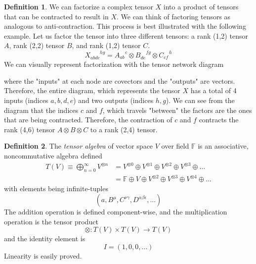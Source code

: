 \documentclass{article}
\theoremstyle{remark}
\theoremstyle{definition}
\newtheorem{definition}{Definition}[section]
\begin{document}
\begin{definition}
We can factorize a complex tensor $X$ into a product of tensors that can be contracted to result in $X$. We can think of factoring tensors as analogous to anti-contraction. This process is best illustrated with the following example. Let us factor the tensor into three different tensors: a rank (1,2) tensor $A$, rank (2,2) tensor $B$, and rank (1,2) tensor $C$. 
\[X_{abde}^{\;\;\;\;\;\;\;hg} = A_{ab}^{\;\;\;\;c} \otimes B_{de}^{\;\;\;\;fg} \otimes C_{cf}^{\;\;\;\;h}\]
We can visually represent factorization with the tensor network diagram
\begin{center}
\end{center}
where the "inputs" at each node are covectors and the "outputs" are vectors. Therefore, the entire diagram, which represents the tensor $X$ has a total of 4 inputs (indices $a, b, d, e$) and two outputs (indices $h, g$). We can see from the diagram that the indices $c$ and $f$, which travels "between" the factors are the ones that are being contracted. Therefore, the contraction of $c$ and $f$ contracts the rank (4,6) tensor $A \otimes B \otimes C$ to a rank (2,4) tensor. 
\end{definition}

\begin{definition}
The \textit{tensor algebra} of vector space $V$ over field $\mathbb{F}$ is an associative, noncommutative algebra defined
\begin{align*}
    T(V) \equiv \bigoplus_{n = 0}^{\infty} V^{\otimes n} & = V^{\otimes 0} \oplus V^{\otimes 1} \oplus V^{\otimes 2} \oplus V^{\otimes 3} \oplus ... \\
    & = \mathbb{F} \oplus V \oplus V^{\otimes 2} \oplus V^{\otimes 3} \oplus V^{\otimes 4} \oplus ...
\end{align*}
with elements being infinite-tuples
\[ (a, B^\mu, C^{\nu \gamma}, D^{\alpha \beta \epsilon}, ...)\]
The addition operation is defined component-wise, and the multiplication operation is the tensor product 
\[\otimes: T(V) \times T(V) \longrightarrow T(V)\]
and the identity element is
\[I = (1, 0, 0, ...) \]
Linearity is easily proved. 
\end{definition}
\end{document}
